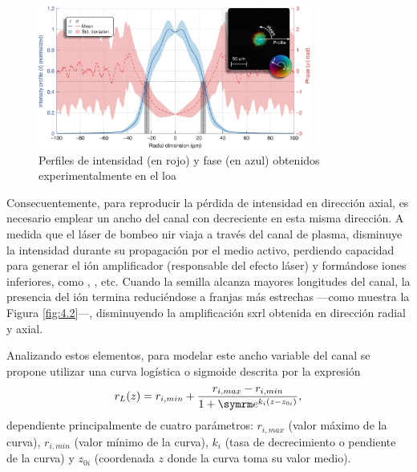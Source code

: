 \begin{figure}[htbp]
  \centering
  \includegraphics[width=0.8\textwidth]{Figuras/ch2_curvas_lab.png}
  \caption{Perfiles de intensidad (en rojo) y fase (en azul)\autocite{Tuitje2020} obtenidos experimentalmente en el \acrshort{loa}}
  \label{fig:4.1}
\end{figure}

Consecuentemente, para reproducir la pérdida de intensidad en dirección axial, es necesario emplear un ancho del canal con  decreciente en esta misma dirección. A medida que el láser de bombeo \acrshort{nir} viaja a través del canal de plasma, disminuye la intensidad durante su propagación por el medio activo, perdiendo capacidad para generar el ión amplificador  (responsable del efecto láser) y formándose iones inferiores, como , , etc. Cuando la semilla alcanza mayores longitudes del canal, la presencia del ión termina reduciéndose a franjas más estrechas ---como muestra la Figura \ref{fig:4.2}---, disminuyendo la amplificación \acrshort{sxrl} obtenida en dirección radial y axial.

Analizando estos elementos, para modelar este ancho variable del canal se propone utilizar una curva logística o sigmoide descrita por la expresión 
\begin{equation}\label{eq:4.0}
  r_{L}(z) = r_{i,min} + \frac{r_{i,max}-r_{i,min}}{1+\eu^{k_{i}(z-z_{0i})}},
\end{equation}
dependiente principalmente de cuatro parámetros: $r_{i,max}$ (valor máximo de la curva), $r_{i,min}$ (valor mínimo de la curva), $k_{i}$ (tasa de decrecimiento o pendiente de la curva) y $z_{0i}$ (coordenada $z$ donde la curva toma su valor medio).

